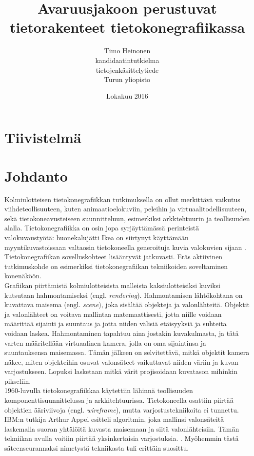 \documentclass[a4paper, 12pt, titlepage]{article}
\title{Avaruusjakoon perustuvat tietorakenteet tietokonegrafiikassa}
\author{Timo Heinonen \\kandidaatintutkielma \\ tietojenkäsittelytiede \\ Turun yliopisto}
\date{Lokakuu 2016}
\begin{document}


\newpage
{}%
\thispagestyle{empty}
\section*{Tiivistelmä}

\newpage
{}%

\tableofcontents


\newpage
\section{Johdanto}

Kolmiulotteisen tietokonegrafiikkan tutkimuksella on ollut merkittävä vaikutus viihdeteollisuuteen, kuten animaatioelokuviin, peleihin ja virtuaalitodellisuuteen, sekä tietokoneavusteiseen suunnitteluun, esimerkiksi arkktehtuurin ja teollisuuden alalla. Tietokonegrafiikka on osin jopa syrjäyttämässä perinteistä valokuvaustyötä: huonekalujätti Ikea on siirtynyt käyttämään myyntikuvastoissaan valtaosin tietokoneella generoituja kuvia valokuvien sijaan \citep{ikea}. Tietokonegrafiikan sovelluskohteet lisääntyvät jatkuvasti. Eräs aktiivinen tutkimuskohde on esimerkiksi tietokonegrafiikan tekniikoiden soveltaminen konenäköön. \citep[.]{hughes}\\

Grafiikan piirtämistä kolmiulotteisista malleista kaksiulotteisiksi kuviksi kutsutaan hahmontamiseksi (engl. \emph{rendering}). Hahmontamisen lähtökohtana on kuvattava maisema (engl. \emph{scene}), joka sisältää objekteja ja valonlähteitä. Objektit ja valonlähteet on voitava mallintaa matemaattisesti, jotta niille voidaan määrittää sijainti ja suuntaus ja jotta niiden välisiä etäisyyksiä ja suhteita voidaan laskea. Hahmontaminen tapahtuu aina jostakin kuvakulmasta, ja tätä varten määritellään virtuaalinen kamera, jolla on oma sijaintinsa ja suuntauksensa maisemassa. Tämän jälkeen on selvitettävä, mitkä objektit kamera näkee, miten objekteihin osuvat valonsäteet vaikuttavat niiden väriin ja kuvan varjostukseen. Lopuksi lasketaan mitkä värit projisoidaan kuvatason mihinkin pikseliin. \citep[.]{janke}\\

1960-luvulla tietokonegrafiikkaa käytettiin lähinnä teollisuuden komponenttisuunnittelussa ja arkkitehtuurissa. Tietokoneella osattiin piirtää objektien ääriviivoja (engl. \emph{wireframe}), mutta varjostustekniikoita ei tunnettu. IBM:n tutkija Arthur Appel esitteli algoritmin, joka mallinsi valonsäteitä laskemalla suoran yhtälöitä kuvasta maisemaan ja siitä valonlähteisiin. Tämän tekniikan avulla voitiin piirtää yksinkertaisia varjostuksia. \citep[.]{appel}. Myöhemmin tästä säteenseurannaksi nimetystä tekniikasta tuli erittäin suosittu.\\
\end{document}
